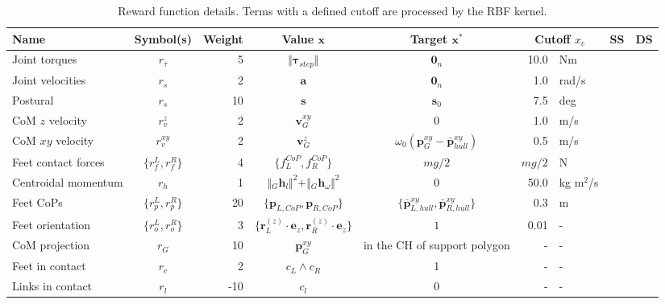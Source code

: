 \begin{table}
    \center
    \caption{Reward function details. Terms with a defined cutoff are processed by the RBF kernel.}
    \label{tab:reward}
    \newcommand{\ck}{\checkmark}
    \setlength\extrarowheight{2pt}
    \begin{tabular}{lcrccrlrr}
        \toprule
        Name & Symbol(s) & Weight & Value $\mathbf{x}$ & Target $\mathbf{x}^*$ & \multicolumn{2}{c}{Cutoff $x_c$}  & SS & DS \\
        \midrule \rowcolor{black!10}
        Joint torques & $r_\tau$ & 5 & $\Vert \boldsymbol{\tau}_{step} \Vert $ & $\boldsymbol{0}_n$ & 10.0 & Nm & \ck & \ck \\
        Joint velocities & $r_{\dot{s}}$ & 2 & $\boldsymbol{a}$ & $\boldsymbol{0}_n$ & 1.0 & rad/s & \ck & \ck \\ \rowcolor{black!10}
        Postural & $r_{s}$ & 10 & $\boldsymbol{s}$ & $\boldsymbol{s}_0$ & 7.5 & deg & & \ck \\
        CoM $z$ velocity & $r_{v}^z$ & 2 & $\boldsymbol{v}^{xy}_{G}$ & $0$ & 1.0 & m/s & \ck & \ck \\ \rowcolor{black!10}
        CoM $xy$ velocity & $r_{v}^{xy}$ & 2 & $\boldsymbol{v}^{z}_{G}$ & $\omega_0 (\boldsymbol{p}^{xy}_{G} - \boldsymbol{\bar{p}}^{xy}_{hull})$ & 0.5 & m/s & & \ck \\
        Feet contact forces & $\{r_{f}^L, r_{f}^R\}$ & 4 & $\{f^{CoP}_L, f^{CoP}_R\}$ & $m g / 2$ & $m g / 2$ & N & \ck & \ck \\ \rowcolor{black!10}
        Centroidal momentum & $r_h$ & 1 & $\Vert {}_{G} \mathbf{h}_l \Vert^2 + \Vert {}_{G} \mathbf{h}_\omega \Vert^2$ & 0 & 50.0 & kg m$^2$/s & \ck & \ck \\
        Feet CoPs & $\{r_{p}^L, r_{p}^R\}$ & 20 & $\{\boldsymbol{p}_{L, CoP}, \boldsymbol{p}_{R, CoP}\}$ & $\{\bar{\boldsymbol{p}}^{xy}_{L, hull}, \bar{\boldsymbol{p}}^{xy}_{R, hull}\}$ & 0.3 & m & \ck & \ck \\ \rowcolor{black!10}
        Feet orientation & $\{r_{o}^L, r_{o}^R\}$ & 3 & $\{\mathbf{r}^{(z)}_L \cdot \mathbf{e}_z, \mathbf{r}^{(z)}_R \cdot \mathbf{e}_z\}$ & $1$ & 0.01 & - & \ck & \ck \\
        CoM projection & $r_{G}$ & 10 & $\boldsymbol{p}^{xy}_{G}$ & in the CH of support polygon & \multicolumn{1}{r}{-} & - & & \ck \\ \rowcolor{black!10}
        Feet in contact & $r_{c}$ & 2 & $c_L \land c_R$ & 1 & \multicolumn{1}{r}{-} & - & \ck & \ck \\
        Links in contact & $r_l$ & -10 & $c_{l}$ & $0$ & \multicolumn{1}{r}{-} & - & \ck & \ck \\
        \bottomrule
    \end{tabular}
\end{table}

